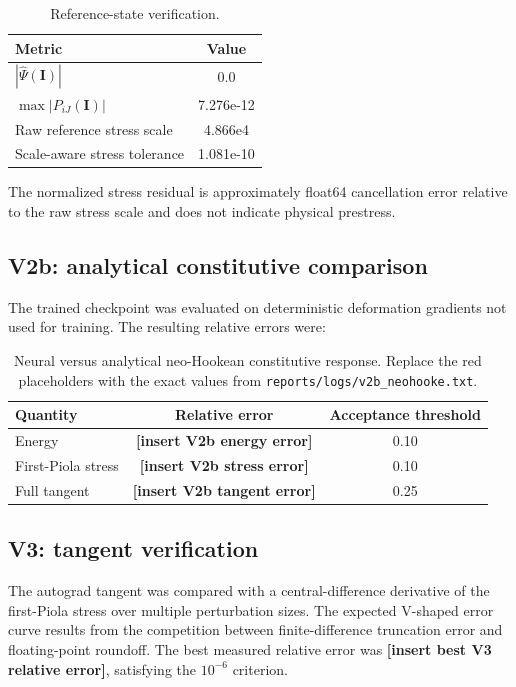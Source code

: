\documentclass[11pt,a4paper]{article}
\newcommand{\Iten}{\mathbf{I}}
\newcommand{\placeholder}[1]{\textcolor{red!70!black}{\textbf{[#1]}}}
\begin{document}
\begin{table}[H]
  \centering
  \caption{Reference-state verification.}
  \label{tab:v2}
  \begin{tabular}{lS}
    \toprule
    Metric & {Value}\\
    \midrule
    $\left|\widehat{\Psi}(\Iten)\right|$ & 0.0\\
    $\max\left|P_{iJ}(\Iten)\right|$ & 7.276e-12\\
    Raw reference stress scale & 4.866e4\\
    Scale-aware stress tolerance & 1.081e-10\\
    \bottomrule
  \end{tabular}
\end{table}
The normalized stress residual is approximately float64 cancellation error
relative to the raw stress scale and does not indicate physical prestress.

\subsection{V2b: analytical constitutive comparison}

The trained checkpoint was evaluated on deterministic deformation gradients
not used for training. The resulting relative errors were:
\begin{table}[H]
  \centering
  \caption{Neural versus analytical neo-Hookean constitutive response. Replace
  the red placeholders with the exact values from
  \texttt{reports/logs/v2b\_neohooke.txt}.}
  \label{tab:v2b}
  \begin{tabular}{lcc}
    \toprule
    Quantity & Relative error & Acceptance threshold\\
    \midrule
    Energy & \placeholder{insert V2b energy error} & 0.10\\
    First-Piola stress & \placeholder{insert V2b stress error} & 0.10\\
    Full tangent & \placeholder{insert V2b tangent error} & 0.25\\
    \bottomrule
  \end{tabular}
\end{table}

\subsection{V3: tangent verification}

The autograd tangent was compared with a central-difference derivative of
the first-Piola stress over multiple perturbation sizes. The expected
V-shaped error curve results from the competition between finite-difference
truncation error and floating-point roundoff. The best measured relative
error was \placeholder{insert best V3 relative error}, satisfying the
$10^{-6}$ criterion.
\end{document}

